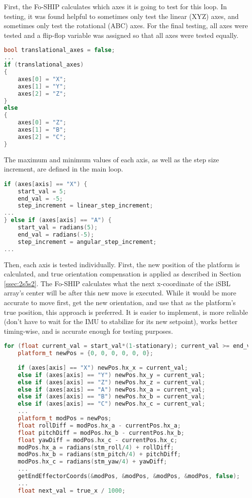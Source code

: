 \documentclass[12pt,a4paper]{report}
\begin{document}
First, the Fo-SHIP calculates which axes it is going to test for this loop. In testing, it was found helpful to sometimes only test the linear (XYZ) axes, and sometimes only test the rotational (ABC) axes. For the final testing, all axes were tested and a flip-flop variable was assigned so that all axes were tested equally. 

\begin{lstlisting}[language=C++]
bool translational_axes = false;
...
if (translational_axes) 
{
	axes[0] = "X";
	axes[1] = "Y";
	axes[2] = "Z";
}
else 
{
	axes[0] = "Z";
	axes[1] = "B";
	axes[2] = "C";
}
\end{lstlisting}

The maximum and minimum values of each axis, as well as the step size increment, are defined in the main loop.

\begin{lstlisting}[language=C++]
if (axes[axis] == "X") {
	start_val = 5;
	end_val = -5;
	step_increment = linear_step_increment;
...
} else if (axes[axis] == "A") {
	start_val = radians(5);
	end_val = radians(-5);
	step_increment = angular_step_increment;
...
\end{lstlisting}
	
Then, each axis is tested individually. First, the new position of the platform is calculated, and true orientation compensation is applied as described in Section \ref{ssec:2s5s2}. The Fo-SHIP calculates what the next x-coordinate of the iSBL array’s center will be after this new move is executed. While it would be more accurate to move first, get the new orientation, and use that as the platform’s true position, this approach is preferred. It is easier to implement, is more reliable (don’t have to wait for the IMU to stabilize for its new setpoint), works better timing-wise, and is accurate enough for testing purposes. 

\begin{lstlisting}[language=C++]
for (float current_val = start_val*(1-stationary); current_val >= end_val; current_val -= step_increment*(1-stationary)) {
	platform_t newPos = {0, 0, 0, 0, 0, 0};
	
	if (axes[axis] == "X") newPos.hx_x = current_val;
	else if (axes[axis] == "Y") newPos.hx_y = current_val;
	else if (axes[axis] == "Z") newPos.hx_z = current_val;
	else if (axes[axis] == "A") newPos.hx_a = current_val;
	else if (axes[axis] == "B") newPos.hx_b = current_val;
	else if (axes[axis] == "C") newPos.hx_c = current_val;
	...
	platform_t modPos = newPos;
	float rollDiff = modPos.hx_a - currentPos.hx_a;
	float pitchDiff = modPos.hx_b - currentPos.hx_b;
	float yawDiff = modPos.hx_c - currentPos.hx_c;
	modPos.hx_a = radians(stm_roll/4) + rollDiff;
	modPos.hx_b = radians(stm_pitch/4) + pitchDiff;
	modPos.hx_c = radians(stm_yaw/4) + yawDiff;
	...
	getEndEffectorCoords(&modPos, &modPos, &modPos, &modPos, false);
	...
	float next_val = true_x / 1000;
\end{lstlisting}
\end{document}
